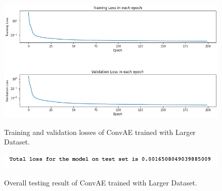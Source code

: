 \begin{figure}[H]
    \caption{Training and validation losses of ConvAE trained with Larger Dataset.}
    \includegraphics[scale=0.6]{figures/mantle_convection_images/larger_dataset/ConvAE_trainingData.png}
    \label{figure:ConvAE_larger_losses}
\end{figure}

\begin{figure}[H]
    \caption{Overall testing result of ConvAE trained with Larger Dataset.}
    \includegraphics[scale=0.8]{figures/mantle_convection_images/larger_dataset/ConvAE_OverallTesting.png}
    \label{figure:ConvAE_larger_testing}
\end{figure}

